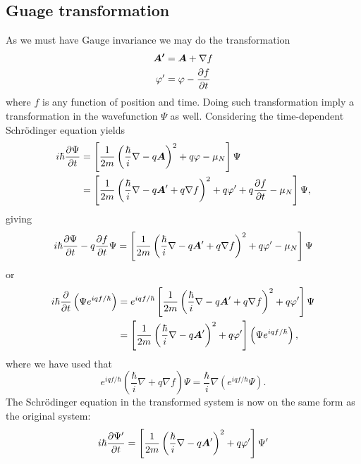 \subsection{Guage transformation}
As we must have Gauge invariance we may do the transformation 
\begin{equation}
\begin{split}
    \boldsymbol{A'} &= \boldsymbol{A} + \nabla f\\
    \varphi' &= \varphi - \frac{\partial f}{\partial t}
\end{split}
\end{equation}
where $f$ is any function of position and time. Doing such transformation imply a transformation in the wavefunction $\Psi$ as well. Considering the time-dependent Schrödinger equation yields
\begin{equation}
\begin{split}
    i\hbar\frac{\partial\Psi}{\partial t} &= \left[\frac{1}{2m}\left(\frac{\hbar}{i}\nabla-q\boldsymbol{A}\right)^2+q\varphi -\mu_N\right]\Psi\\
    &= \left[\frac{1}{2m}\left(\frac{\hbar}{i}\nabla-q\boldsymbol{A}'+ q\nabla f \right)^2+q\varphi' + q\frac{\partial f}{\partial t} -\mu_N\right]\Psi,
\end{split}
\end{equation}
giving
\begin{equation}
i\hbar\frac{\partial \Psi}{\partial t}-q\frac{\partial f}{\partial t}\Psi = \left[\frac{1}{2m}\left(\frac{\hbar}{i}\nabla-q\boldsymbol{A}'+ q\nabla f \right)^2+q\varphi' -\mu_N\right]\Psi
\end{equation}
or
\begin{equation}
\begin{split}
    i\hbar\frac{\partial}{\partial t}\left(\Psi e^{iqf/\hbar}\right) &= e^{iqf/\hbar}\left[\frac{1}{2m}\left(\frac{\hbar}{i}\nabla-q\boldsymbol{A}'+q\nabla f\right)^2+q\varphi'\right]\Psi\\
    &=\left[\frac{1}{2m}\left(\frac{\hbar}{i}\nabla-q\boldsymbol{A}'\right)^2 + q \varphi' \right]\left(\Psi e^{iqf/\hbar}\right),
\end{split}
\end{equation}
where we have used that
\begin{equation}
    e^{iqf/\hbar}\left(\frac{\hbar}{i}\nabla + q\nabla f \right)\Psi = \frac{\hbar}{i}\nabla\left( e^{iqf/\hbar}\Psi \right).
\end{equation}
The Schrödinger equation in the transformed system is now on the same form as the original system:
\begin{equation}
    i\hbar\frac{\partial \Psi'}{\partial t} = \left[\frac{1}{2m}\left(\frac{\hbar}{i}\nabla -q\boldsymbol{A}'\right)^2 + q\varphi'\right]\Psi'
\end{equation}
